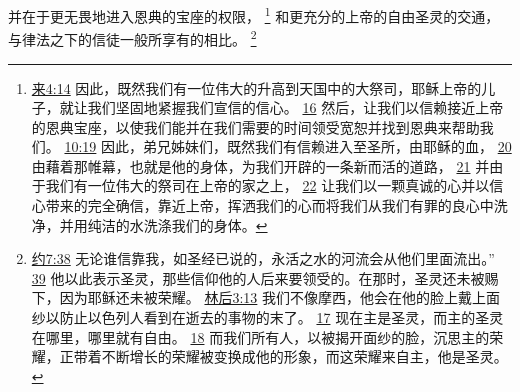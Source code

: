\documentclass[12pt, a4paper, oneside]{ctexart}
\begin{document}
	并在于更无畏地进入恩典的宝座的权限，
	\footnote {
		\href{https://biblehub.com/hebrews/4-14.htm}{来4:14} 因此，既然我们有一位伟大的升高到天国中的大祭司，耶稣上帝的儿子，就让我们坚固地紧握我们宣信的信心。
		\href{https://biblehub.com/hebrews/4-16.htm}{16} 然后，让我们以信赖接近上帝的恩典宝座，以使我们能并在我们需要的时间领受宽恕并找到恩典来帮助我们。
		\href{https://biblehub.com/hebrews/10-19.htm}{10:19} 因此，弟兄姊妹们，既然我们有信赖进入至圣所，由耶稣的血，
		\href{https://biblehub.com/hebrews/10-20.htm}{20} 由藉着那帷幕，也就是他的身体，为我们开辟的一条新而活的道路，
		\href{https://biblehub.com/hebrews/10-21.htm}{21} 并由于我们有一位伟大的祭司在上帝的家之上，
		\href{https://biblehub.com/hebrews/10-22.htm}{22} 让我们以一颗真诚的心并以信心带来的完全确信，靠近上帝，挥洒我们的心而将我们从我们有罪的良心中洗净，并用纯洁的水洗涤我们的身体。
	}
	和更充分的上帝的自由圣灵的交通，与律法之下的信徒一般所享有的相比。
	\footnote {
		\href{https://biblehub.com/john/7-38.htm}{约7:38} 无论谁信靠我，如圣经已说的，永活之水的河流会从他们里面流出。”
		\href{https://biblehub.com/john/7-39.htm}{39} 他以此表示圣灵，那些信仰他的人后来要领受的。在那时，圣灵还未被赐下，因为耶稣还未被荣耀。
		\href{https://biblehub.com/2_corinthians/3-13.htm}{林后3:13} 我们不像摩西，他会在他的脸上戴上面纱以防止以色列人看到在逝去的事物的末了。
		\href{https://biblehub.com/2_corinthians/3-17.htm}{17} 现在主是圣灵，而主的圣灵在哪里，哪里就有自由。
		\href{https://biblehub.com/2_corinthians/3-18.htm}{18} 而我们所有人，以被揭开面纱的脸，沉思主的荣耀，正带着不断增长的荣耀被变换成他的形象，而这荣耀来自主，他是圣灵。
	}
\end{document}
